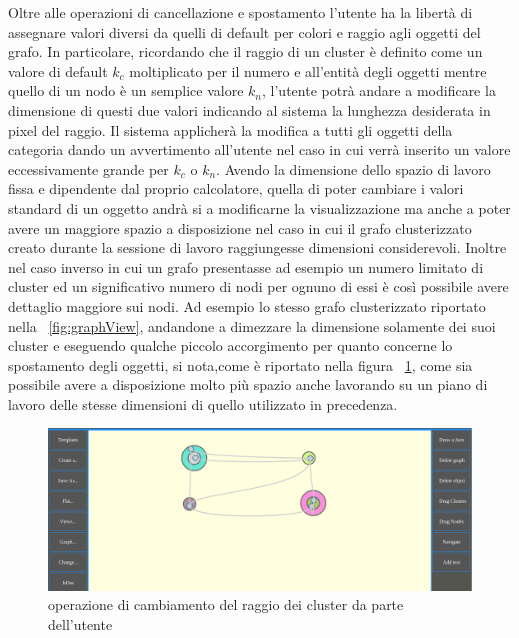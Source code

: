 {\newline
Oltre alle operazioni di cancellazione e spostamento l'utente ha la libertà di assegnare valori diversi da quelli di default per colori e raggio agli oggetti del grafo. In particolare, ricordando che il raggio di un cluster è definito come un valore di default $k_c$ moltiplicato per il numero e all'entità degli oggetti mentre quello di un nodo è un semplice valore $k_n$, l'utente potrà andare a modificare la dimensione di questi due valori indicando al sistema la lunghezza desiderata in pixel del raggio. Il sistema applicherà la modifica a tutti gli oggetti della categoria dando un avvertimento all'utente nel caso in cui verrà inserito un valore eccessivamente grande per $k_c$ o $k_n$. Avendo la dimensione dello spazio di lavoro fissa e dipendente dal proprio calcolatore, quella di poter cambiare i valori standard di un oggetto andrà si a modificarne la visualizzazione ma anche a poter avere un maggiore spazio a disposizione nel caso in cui il grafo clusterizzato creato durante la sessione di lavoro raggiungesse dimensioni considerevoli. Inoltre  nel caso inverso in cui un grafo presentasse ad esempio un numero limitato di cluster ed un significativo numero di nodi per ognuno di essi è così possibile avere dettaglio maggiore sui nodi. Ad esempio lo stesso grafo clusterizzato riportato nella \figurename~\ref{fig:graphView}, andandone a dimezzare la dimensione solamente dei suoi cluster e eseguendo qualche piccolo accorgimento per quanto concerne lo spostamento degli oggetti, si nota,come è riportato nella figura \figurename~\ref{fig:changeRad}, come sia possibile avere a disposizione molto più spazio anche lavorando su un piano di lavoro delle stesse dimensioni di quello utilizzato in precedenza.
\begin{figure}[!htb]
	\begin{center}
		\includegraphics[width=0.8 \linewidth]{figure/changeRad}
	\end{center}
	\caption{operazione di cambiamento del raggio dei cluster da parte dell'utente\label{fig:changeRad}}
\end{figure}
\newline
}
